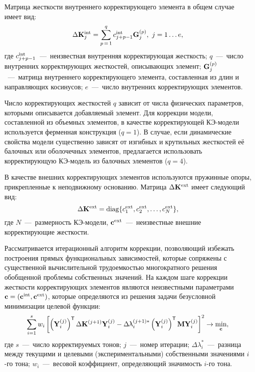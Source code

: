 Матрица жесткости внутреннего корректирующего элемента в общем случае имеет вид:
\begin{equation}
	\Delta \mathbf{K} ^ {\text{int}}_j = \sum\limits_{p\,=\,1}^{q} c ^ {\text{int}}_{j+p-1} \mathbf{G}_j^{(p)}, \ j = 1 \hdots e, \label{eq:internalStiffMatrix}
\end{equation}
где $ c ^ {\text{int}}_{j+p-1} $~---~неизвестная внутренняя корректирующая жесткость; $ q $~---~число внутренних корректирующих жесткостей, описывающих элемент; $ \mathbf{G}_j^{(p)} $~---~матрица внутреннего корректирующего элемента, составленная из длин и направляющих косинусов; $ e $~---~число внутренних корректирующих элементов. 

Число корректирующих жесткостей $ q $ зависит от числа физических параметров, которыми описывается добавляемый элемент. Для коррекции модели, составленной из объемных элементов, в качестве корректирующей КЭ-модели используется ферменная конструкция ($ q = 1 $). В случае, если динамические свойства модели существенно зависят от изгибных и крутильных жесткостей её балочных или оболочечных элементов, предлагается использовать корректирующую КЭ-модель из балочных элементов ($ q = 4 $). 

В качестве внешних корректирующих элементов используются пружинные опоры, прикрепленные к неподвижному основанию. Матрица $ \Delta \mathbf{K} ^ {\text{ext}} $ имеет следующий вид:
\begin{equation}
	\Delta \mathbf{K} ^ {\text{ext}} = \operatorname{diag} \{ c ^ {\text{ext}}_1, c ^ {\text{ext}}_2, \hdots, c ^ {\text{ext}}_N \}, \label{eq:externalStiffMatrix}
\end{equation}
где $ N $~---~размерность КЭ-модели, $ \mathbf{c} ^ {\text{ext}} $~---~неизвестные внешние корректирующие жесткости. 

Рассматривается итерационный алгоритм коррекции, позволяющий избежать построения прямых функциональных зависимостей, которые сопряжены с существенной вычислительной трудоемкостью многократного решения обобщенной проблемы собственных значений. На каждом шаге коррекции жесткости корректирующих элементов являются неизвестными параметрами $ \mathbf{c} = \left( \mathbf{c} ^ {\text{int}}, \mathbf{c} ^ {\text{ext}} \right) $, которые определяются из решения задачи безусловной минимизации целевой функции:
\begin{gather}
	\sum\limits_{i = 1} ^ s w_i \left[ \left( \mathbf{Y}_i ^ {(j)} \right) ^ \mathsf{T} \Delta \mathbf{K} ^ {(j + 1)} \mathbf{Y}_i ^ {(j)} - \Delta \uplambda_i ^ {(j + 1) \ast} \left( \mathbf{Y}_i ^ {(j)} \right) ^ \mathsf{T} \mathbf{M} \mathbf{Y}_i ^ {(j)} \right] ^ 2 \rightarrow \min_{\mathbf{c}},
\end{gather}
где $ s $~---~число корректируемых тонов; $ j $~---~номер итерации; $ \Delta \lambda_i ^ {\ast}$~---~разница между текущими и целевыми (экспериментальными) собственными значениями $ i $-го тона; $ w_i $~---~весовой коэффициент, определяющий значимость $ i $-го тона.

